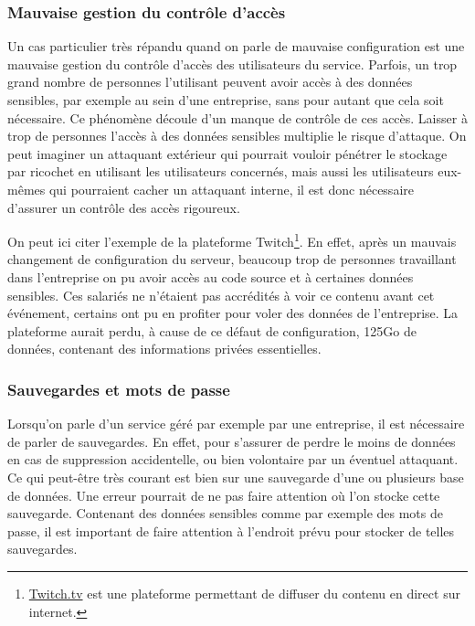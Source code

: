 \documentclass[a4paper, 12pt]{article}
\begin{document}
\begin{spacing}{1.1}
      \subsubsection{Mauvaise gestion du contrôle d'accès}
        Un cas particulier très répandu quand on parle de mauvaise configuration
        est une mauvaise gestion du contrôle d'accès des utilisateurs du
        service. Parfois, un trop grand nombre de personnes l'utilisant peuvent
        avoir accès à des données sensibles, par exemple au sein d'une
        entreprise, sans pour autant que cela soit nécessaire. Ce phénomène
        découle d'un manque de contrôle de ces accès. Laisser à trop de
        personnes l'accès à des données sensibles multiplie le risque d'attaque.
        On peut imaginer un attaquant extérieur qui pourrait vouloir pénétrer le
        stockage par ricochet en utilisant les utilisateurs concernés, mais
        aussi les utilisateurs eux-mêmes qui pourraient cacher un attaquant
        interne, il est donc nécessaire d'assurer un contrôle des accès
        rigoureux.

        On peut ici citer l'exemple de la plateforme Twitch\footnote{
        \url{Twitch.tv} est une plateforme permettant de diffuser du contenu en
        direct sur internet.}. En effet, après un mauvais changement de
        configuration du serveur, beaucoup trop de personnes travaillant dans
        l'entreprise on pu avoir accès au code source et à certaines données
        sensibles. Ces salariés ne n'étaient pas accrédités à voir ce contenu
        avant cet événement, certains ont pu en profiter pour voler des données
        de l'entreprise. La plateforme aurait perdu, à cause de ce défaut de
        configuration, 125Go de données, contenant des informations privées
        essentielles.

      \subsubsection{Sauvegardes et mots de passe}
        Lorsqu'on parle d'un service géré par exemple par une entreprise, il est
        nécessaire de parler de sauvegardes. En effet, pour s'assurer de perdre
        le moins de données en cas de suppression accidentelle, ou bien
        volontaire par un éventuel attaquant. Ce qui peut-être très courant est
        bien sur une sauvegarde d'une ou plusieurs base de données. Une erreur
        pourrait de ne pas faire attention où l'on stocke cette sauvegarde.
        Contenant des données sensibles comme par exemple des mots de passe,
        il est important de faire attention à l'endroit prévu pour stocker de
        telles sauvegardes.


\end{spacing}
\end{document}
